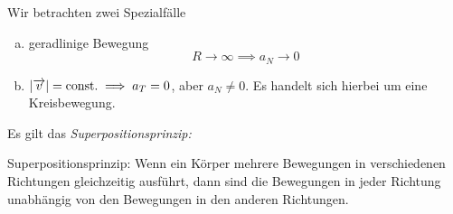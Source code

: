 \documentclass[a4paper,10pt]{scrartcl}
\begin{document}
\begin{ex*} Wir betrachten zwei Spezialfälle
\begin{enumerate}[a)]
\item geradlinige Bewegung
\[
R\rightarrow \infty \implies a_N\rightarrow 0
\] 
\item $|\overrightarrow{v}|=\text{const.} \implies a_T=0$, aber $a_N\neq 0$. Es handelt sich hierbei um eine Kreisbewegung. 
\end{enumerate}
\end{ex*}
Es gilt das \emph{Superpositionsprinzip:}

\begin{seg}{Superpositionsprinzip:} Wenn ein Körper mehrere Bewegungen in verschiedenen Richtungen gleichzeitig ausführt, dann sind die Bewegungen in jeder Richtung unabhängig von den Bewegungen in den anderen Richtungen. 
\end{seg}
\end{document}
